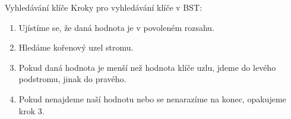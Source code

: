 \documentclass[10pt]{beamer}
\begin{document}
\begin{frame}[t]{Vyhledávání klíče}
    Kroky pro vyhledávání klíče v BST:
    \begin{enumerate}
        \item Ujístíme se, že daná hodnota je v povoleném rozsahu.
        \item Hledáme kořenový uzel stromu.
        \item Pokud daná hodnota je menší než hodnota klíče uzlu, jdeme do levého podstromu, jinak do pravého.
        \item Pokud nenajdeme naší hodnotu nebo se nenarazíme na konec, opakujeme krok 3.
    \end{enumerate}
\end{frame}
\end{document}
